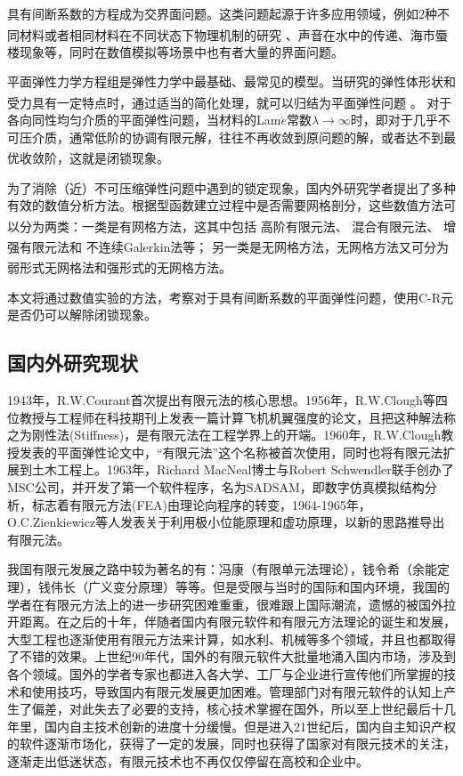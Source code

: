 \documentclass[a4paper,UTF8,titlepage]{ctexart}
\begin{document}
具有间断系数的方程成为交界面问题。这类问题起源于许多应用领域，例如2种不同材料或者相同材料在不同状态下物理机制的研究 \textsuperscript{\cite{邵文婷2017求解一类交界面问题的模态基函数谱元法数值实验}}、声音在水中的传递、海市蜃楼现象等，同时在数值模拟等场景中也有者大量的界面问题。

平面弹性力学方程组是弹性力学中最基础、最常见的模型。当研究的弹性体形状和受力具有一定特点时，通过适当的简化处理，就可以归结为平面弹性问题 \textsuperscript{\cite{王兆清2018不可压缩平面问题的位移}}。
对于各向同性均匀介质的平面弹性问题，当材料的Lam$\acute{e}$常数$\lambda \to \infty$时，即对于几乎不可压介质，通常低阶的协调有限元解，往往不再收敛到原问题的解，或者达不到最优收敛阶，这就是闭锁现象\textsuperscript{\cite{陈绍春2007平面弹性的一个新的}}。

为了消除（近）不可压缩弹性问题中遇到的锁定现象，国内外研究学者提出了多种有效的数值分析方法。根据型函数建立过程中是否需要网格剖分，这些数值方法可以分为两类：一类是有网格方法，这其中包括
高阶有限元法\textsuperscript{\cite{peet2014legendre}}、
混合有限元法\textsuperscript{\cite{masud2011variational}}、
增强有限元法\textsuperscript{\cite{auricchio2005analysis}}和
不连续Galerkin法\textsuperscript{\cite{hansbo2003discontinuous}}等；
另一类是无网格方法，无网格方法又可分为弱形式无网格法和强形式的无网格方法\textsuperscript{\cite{王兆清2018不可压缩平面问题的位移}}。

本文将通过数值实验的方法，考察对于具有间断系数的平面弹性问题，使用C-R元是否仍可以解除闭锁现象。

\subsection{国内外研究现状}

1943年，R.W.Courant首次提出有限元法的核心思想。1956年，R.W.Clough等四位教授与工程师在科技期刊上发表一篇计算飞机机翼强度的论文，且把这种解法称之为刚性法(Stiffness)，是有限元法在工程学界上的开端。1960年，R.W.Clough教授发表的平面弹性论文中，“有限元法”这个名称被首次使用，同时也将有限元法扩展到土木工程上。1963年，Richard MacNeal博士与Robert Schwendler联手创办了MSC公司，并开发了第一个软件程序，名为SADSAM，即数字仿真模拟结构分析，标志着有限元方法(FEA)由理论向程序的转变，1964-1965年，O.C.Zienkiewicz等人发表关于利用极小位能原理和虚功原理，以新的思路推导出有限元法。

我国有限元发展之路中较为著名的有：冯康（有限单元法理论），钱令希（余能定理），钱伟长（广义变分原理）等等。但是受限与当时的国际和国内环境，我国的学者在有限元方法上的进一步研究困难重重，很难跟上国际潮流，遗憾的被国外拉开距离。在之后的十年，伴随者国内有限元软件和有限元方法理论的诞生和发展，大型工程也逐渐使用有限元方法来计算，如水利、机械等多个领域，并且也都取得了不错的效果。上世纪90年代，国外的有限元软件大批量地涌入国内市场，涉及到各个领域。国外的学者专家也都进入各大学、工厂与企业进行宣传他们所掌握的技术和使用技巧，导致国内有限元发展更加困难。管理部门对有限元软件的认知上产生了偏差，对此失去了必要的支持，核心技术掌握在国外，所以至上世纪最后十几年里，国内自主技术创新的进度十分缓慢。但是进入21世纪后，国内自主知识产权的软件逐渐市场化，获得了一定的发展，同时也获得了国家对有限元技术的关注，逐渐走出低迷状态，有限元技术也不再仅仅停留在高校和企业中。
\end{document}
